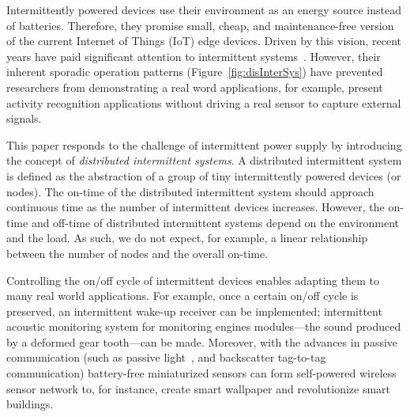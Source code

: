 

Intermittently powered devices use their environment as an energy source instead of batteries. Therefore, they promise small, cheap, and maintenance-free version of the current Internet of Things (IoT) edge devices. Driven by this vision, recent years have paid significant attention to intermittent systems~\cite{hicks2017clank,lucia2017intermittent,colin2016chain,colin2018termination,yildirim2018ink}. 
%
However, their inherent sporadic operation patterns (Figure~\ref{fig:disInterSys}) have prevented researchers from demonstrating a real word applications, for example, \cite{colin2016chain,hester2017timely} present activity recognition applications without driving a real sensor to capture external signals.

%
This paper responds to the challenge of intermittent power supply by introducing the concept of \textit{distributed intermittent systems}. A distributed intermittent system is defined as the abstraction of a group of tiny intermittently powered devices (or nodes). The on-time of the distributed intermittent system should approach continuous time as the number of intermittent devices increases. However, the on-time and off-time of  distributed intermittent systems depend on the environment and the load. As such, we do not expect, for example, a linear relationship between the number of nodes and the overall on-time.

Controlling the on/off cycle of intermittent devices enables adapting them to many real world applications. For example, once a certain on/off cycle is preserved, an intermittent wake-up receiver can be implemented; intermittent acoustic monitoring system for monitoring engines modules---the sound produced by a deformed gear tooth---can be made. Moreover, with the advances in passive communication (such as passive light~\cite{}, and backscatter tag-to-tag~\cite{} communication) battery-free miniaturized sensors can form self-powered wireless sensor network to, for instance, create smart wallpaper and revolutionize smart buildings. 


